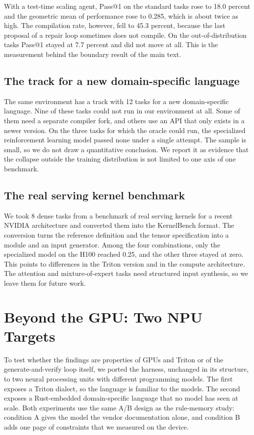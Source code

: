 With a test-time scaling agent, Pass@1 on the standard tasks rose to 18.0 percent and the geometric
mean of performance rose to 0.285, which is about twice as high. The compilation rate, however, fell
to 45.3 percent, because the last proposal of a repair loop sometimes does not compile. On the
out-of-distribution tasks Pass@1 stayed at 7.7 percent and did not move at all. This is the
measurement behind the boundary result of the main text.

\subsection{The track for a new domain-specific language}
The same environment has a track with 12 tasks for a new domain-specific language. Nine of these
tasks could not run in our environment at all. Some of them need a separate compiler fork, and
others use an API that only exists in a newer version. On the three tasks for which the oracle could
run, the specialized reinforcement learning model passed none under a single attempt. The sample is
small, so we do not draw a quantitative conclusion. We report it as evidence that the collapse
outside the training distribution is not limited to one axis of one benchmark.

\subsection{The real serving kernel benchmark}
We took 8 dense tasks from a benchmark of real serving kernels for a recent NVIDIA architecture and
converted them into the KernelBench format. The conversion turns the reference definition and the
tensor specification into a module and an input generator. Among the four combinations, only the
specialized model on the H100 reached 0.25, and the other three stayed at zero. This points to
differences in the Triton version and in the compute architecture. The attention and mixture-of-expert
tasks need structured input synthesis, so we leave them for future work.

\section{Beyond the GPU: Two NPU Targets}\label{sec:app-npu}

To test whether the findings are properties of GPUs and Triton or of the generate-and-verify loop
itself, we ported the harness, unchanged in its structure, to two neural processing units with
different programming models. The first exposes a Triton dialect, so the language is familiar to the
models. The second exposes a Rust-embedded domain-specific language that no model has seen at scale.
Both experiments use the same A/B design as the rule-memory study: condition A gives the model the
vendor documentation alone, and condition B adds one page of constraints that we measured on the
device.

